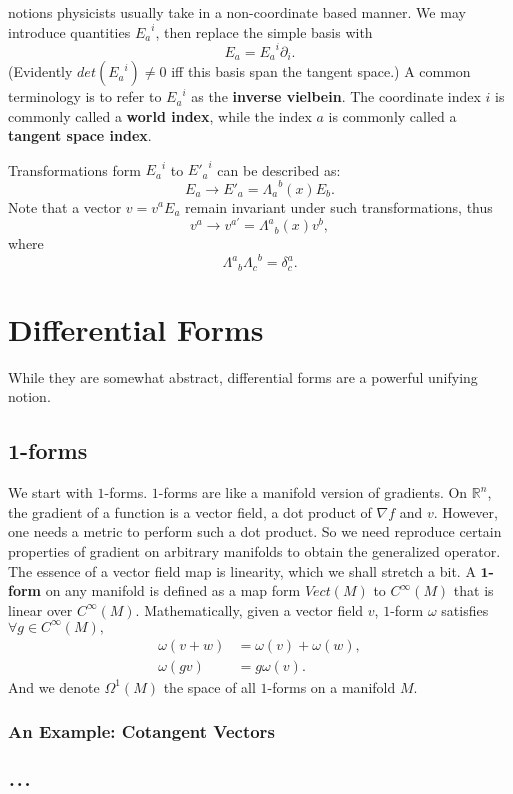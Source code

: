 \documentclass[a4paper,11pt]{article}
\theoremstyle{remark}
\begin{document}
notions physicists usually take in a non-coordinate based manner. We
may introduce quantities ${E_a}^i$, then replace the simple basis
with $$E_a = {E_a}^i\partial_i.$$ (Evidently $det({E_a}^i)\neq 0$ iff
this basis span the tangent space.) A common terminology is to refer
to ${E_a}^i$ as the \textbf{inverse vielbein}. The coordinate index
$i$ is commonly called a \textbf{world index}, while the index $a$ is
commonly called a \textbf{tangent space index}.\par
Transformations form ${E_a}^i$ to ${E'_a}^i$ can be described
as: $$E_a\rightarrow E'_a = {\Lambda_a}^b(x)E_b.$$ Note that a vector
$v = v^aE_a$ remain invariant under such transformations,
thus $$v^a\rightarrow v^{a '} = {\Lambda^a}_b(x)v^b,$$
where $${\Lambda^a}_b{\Lambda_c}^b = \delta^a_c.$$
\section{Differential Forms}
While they are somewhat abstract, differential forms are a powerful
unifying notion.
\subsection{$\mathbf{1}$-forms}
\label{sub:1form}
We start with $1$-forms. $1$-forms are like a manifold version of
gradients. On
$\mathbb{R}^n$, the gradient of a function is a vector field, a dot
product of $\nabla f$ and $v$. However, one needs a metric to perform
such a dot product. So we need reproduce certain properties of gradient on
arbitrary manifolds to obtain the generalized operator. The essence of
a vector field map is linearity, which we shall stretch a bit. A
$\mathbf{1}$\textbf{-form} on any manifold is defined as a map form $Vect(M)$ to
$C^{\infty}(M)$ that is linear over $C^{\infty}(M)$. Mathematically,
given a vector field $v$, $1$-form $\omega$ satisfies $\forall g\in
C^{\infty}(M),$ 
\begin{align*}
  \omega(v+w) &= \omega(v) + \omega(w),\\
  \omega(g v) &= g \omega(v).
\end{align*}
And we denote $\Omega^1(M)$ the space of all $1$-forms on a manifold $M$.
\subsubsection{An Example: Cotangent Vectors}
\label{1f:e}





\section{$\ldots$}
\end{document}
